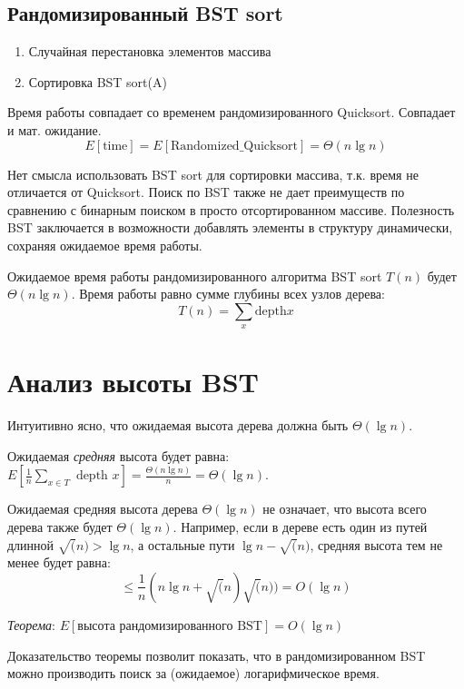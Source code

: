 \documentclass[11pt]{article}
\begin{document}
\subsection{Рандомизированный BST sort}
\begin{enumerate}
\item Случайная перестановка элементов массива
\item Сортировка BST sort(A)
\end{enumerate}

Время работы совпадает со временем рандомизированного Quicksort. Совпадает и мат. ожидание.
\begin{equation*}
  E[\text{time}] = E[\text{Randomized\_Quicksort}] = \Theta(n \lg n)
\end{equation*}

Нет смысла использовать BST sort для сортировки массива, т.к. время не отличается от Quicksort. Поиск по BST также не дает преимуществ по сравнению с бинарным поиском в просто отсортированном массиве. Полезность BST заключается в возможности добавлять элементы в структуру динамически, сохраняя ожидаемое время работы.

Ожидаемое время работы рандомизированного алгоритма BST sort $T(n)$ будет $\Theta(n \lg n)$. Время работы равно сумме глубины всех узлов дерева:
\begin{equation*}
  T(n) = \sum_{x} \text{depth} x
\end{equation*}

\section{Анализ высоты BST}
Интуитивно ясно, что ожидаемая высота дерева должна быть $\Theta(\lg n)$.

Ожидаемая \emph{средняя} высота будет равна: $E[\frac{1}{n}\sum_{x \in T} \text{ depth } x] = \frac{\Theta(n \lg n)}{n} = \Theta(\lg n)$.

Ожидаемая средняя высота дерева $\Theta(\lg n)$ не означает, что высота всего дерева также будет $\Theta(\lg n)$. Например, если в дереве есть один из путей длинной $\sqrt(n) > \lg n$, а остальные пути $\lg{n - \sqrt(n)}$, средняя высота тем не менее будет равна:
\begin{equation*}
 \leqslant \frac{1}{n}(n \lg n + \sqrt(n) \sqrt(n)) = O(\lg n)
\end{equation*}

\emph{Теорема}: $E[\text{высота рандомизированного BST}] = O(\lg n)$

Доказательство теоремы позволит показать, что в рандомизированном BST можно производить поиск за (ожидаемое) логарифмическое время.
\end{document}
